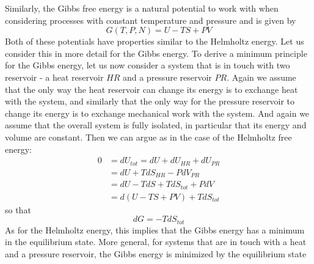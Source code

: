 \documentclass[a4paper, draft]{article}
\theoremstyle{own}
\theoremstyle{remark}
\begin{document}
Similarly, the Gibbs free energy is a natural potential to work with when considering processes with constant temperature and pressure and is given by
$$
G(T, P, N) = U - TS + PV
$$
Both of these potentials have properties similar to the Helmholtz energy. Let us consider this in more detail for the Gibbs energy. To derive a minimum principle for the Gibbs energy, let us now consider a system that is in touch with two reservoir - a heat reservoir $HR$ and a pressure reservoir $PR$. Again we assume that the only way the heat reservoir can change its energy is to exchange heat with the system, and similarly that the only way for the pressure reservoir to change its energy is to exchange mechanical work with the system. And again we assume that the overall system is fully isolated, in particular that its energy and volume are constant. Then we can argue as in the case of the Helmholtz free energy: 
\begin{align*}
	0 &= dU_{tot} = dU + dU_{HR} + dU_{PR}  \\
	&= dU + T dS_{HR} - P dV_{PR} \\
	&= dU - T dS + T dS_{tot} + P dV \\
	&= d(U - TS + PV) + T dS_{tot}
\end{align*}
so that 
$$
dG = - T dS_{tot}
$$
As for the Helmholtz energy, this implies that the Gibbs energy has a minimum in the equilibrium state. More general, for systems that are in touch with a heat and a pressure reservoir, the Gibbs energy is minimized by the equilibrium state
\end{document}
